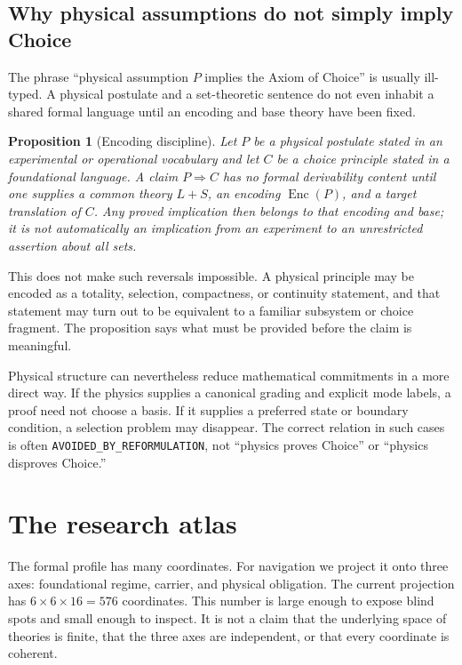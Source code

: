 \documentclass[11pt]{article}
\newtheorem{proposition}{Proposition}[section]
\theoremstyle{definition}
\theoremstyle{remark}
\newcommand{\Enc}{\operatorname{Enc}}
\begin{document}
\subsection{Why physical assumptions do not simply imply Choice}

The phrase ``physical assumption \(P\) implies the Axiom of Choice'' is
usually ill-typed.  A physical postulate and a set-theoretic sentence do not
even inhabit a shared formal language until an encoding and base theory have
been fixed.

\begin{proposition}[Encoding discipline]
Let \(P\) be a physical postulate stated in an experimental or operational
vocabulary and let \(C\) be a choice principle stated in a foundational
language.  A claim \(P\Rightarrow C\) has no formal derivability content until
one supplies a common theory \(L+S\), an encoding \(\Enc(P)\), and a target
translation of \(C\).  Any proved implication then belongs to that encoding
and base; it is not automatically an implication from an experiment to an
unrestricted assertion about all sets.
\end{proposition}

This does not make such reversals impossible.  A physical principle may be
encoded as a totality, selection, compactness, or continuity statement, and
that statement may turn out to be equivalent to a familiar subsystem or
choice fragment.  The proposition says what must be provided before the claim
is meaningful.

Physical structure can nevertheless reduce mathematical commitments in a
more direct way.  If the physics supplies a canonical grading and explicit
mode labels, a proof need not choose a basis.  If it supplies a preferred
state or boundary condition, a selection problem may disappear.  The correct
relation in such cases is often
\texttt{AVOIDED\_BY\_}\allowbreak\texttt{REFORMULATION}, not
``physics proves Choice'' or ``physics disproves Choice.''

\section{The research atlas}
\label{sec:atlas}

The formal profile has many coordinates.  For navigation we project it onto
three axes: foundational regime, carrier, and physical obligation.  The
current projection has \(6\times6\times16=576\) coordinates.  This number is
large enough to expose blind spots and small enough to inspect.  It is not a
claim that the underlying space of theories is finite, that the three axes are
independent, or that every coordinate is coherent.
\end{document}
